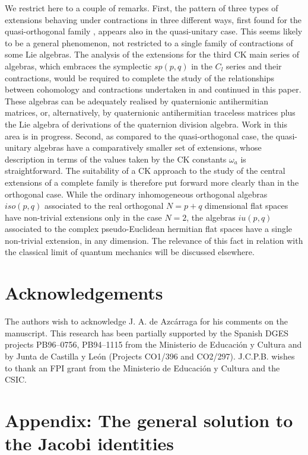 \documentclass[12pt]{article}
\begin{document}
We restrict here to a couple of remarks. First, the pattern of three
types of extensions behaving under contractions in three different ways,
first found for the quasi-orthogonal family \cite{Azc.Her.Bue.San:96}, appears
also in the quasi-unitary
case. This seems likely to be a general phenomenon, not restricted to a single
family of contractions of some Lie algebras. The analysis of the extensions for
the
third CK main series of algebras, which embraces the symplectic
$sp(p,q)$ in
the $C_l$ series and their contractions, would be required to complete the
study of the relationships between cohomology and contractions undertaken
in \cite{Azc.Her.Bue.San:96} and continued in this paper.
These algebras can be adequately realised by quaternionic antihermitian
matrices, or, alternatively, by quaternionic antihermitian traceless matrices
plus
the Lie algebra of derivations of the quaternion
division algebra. Work in this area is in progress. Second, as compared to the
quasi-orthogonal case, the
quasi-unitary algebras have a comparatively smaller set of
extensions, whose description in terms of the values taken by the CK constants
${\omega}_a$ is straightforward. The suitability of a CK approach to the study of the
central extensions of a complete family is therefore put forward more clearly
than in the orthogonal case.
While the ordinary inhomogeneous orthogonal algebras
$iso(p,q)$ associated to the real orthogonal $N=p+q$
dimensional flat spaces have
non-trivial extensions only in the case $N=2$, the algebras $iu(p,q)$
associated to
the complex pseudo-Euclidean hermitian flat spaces have a
single non-trivial extension, in any dimension. The
relevance of this fact in relation with the classical limit of quantum
mechanics
will be discussed elsewhere.

\section*{Acknowledgements}
The authors wish to acknowledge J. A. de Azc\'arraga for his comments on the
manuscript.
This research has been partially supported by the Spanish DGES
projects PB96--0756, PB94--1115
from the Ministerio de Educaci\'on y Cultura and by Junta de Castilla y
Le\'on (Projects CO1/396 and CO2/297). J.C.P.B.
wishes to thank an FPI grant from the Ministerio de Educaci\'on y
Cultura and the CSIC.

\section*{Appendix: The general solution to the Jacobi identities}
\setcounter{equation}{0}
\end{document}
